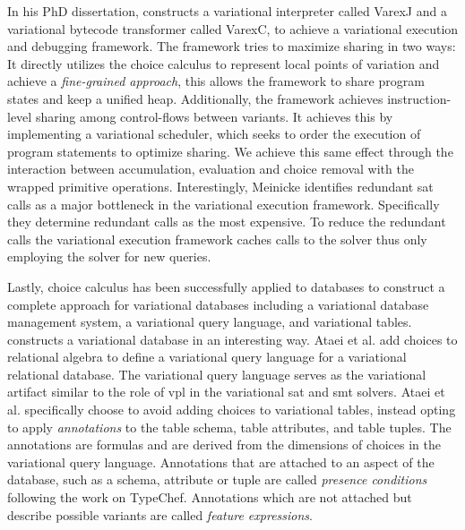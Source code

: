 In his PhD dissertation, \citet{M14,JensDebugging} constructs a variational
interpreter called VarexJ and a variational bytecode transformer called VarexC,
to achieve a variational execution and debugging framework. The framework tries
to maximize sharing in two ways: It directly utilizes the choice calculus to
represent local points of variation and achieve a \emph{fine-grained approach},
this allows the framework to share program states and keep a unified heap.
Additionally, the framework achieves instruction-level sharing among
control-flows between variants. It achieves this by implementing a variational
scheduler, which seeks to order the execution of program statements to optimize
sharing. We achieve this same effect through the interaction between
accumulation, evaluation and choice removal with the wrapped primitive
operations. Interestingly, Meinicke identifies redundant \ac{sat} calls as a
major bottleneck in the variational execution framework. Specifically they
determine redundant  calls as the most expensive. To reduce the
redundant calls the variational execution framework caches calls to the solver
thus only employing the solver for new queries.


Lastly, choice calculus has been successfully applied to databases to construct
a complete approach for variational databases including a variational database
management system, a variational query language, and variational tables.
\citet{ATW17dbpl,ATW18poly} constructs a variational database in an interesting
way. Ataei et al. add choices to relational algebra to define a variational
query language for a variational relational database. The variational query
language serves as the variational artifact similar to the role of \ac{vpl} in
the variational \ac{sat} and \ac{smt} solvers. Ataei et al. specifically choose
to avoid adding choices to variational tables, instead opting to apply
\emph{annotations} to the table schema, table attributes, and table tuples. The
annotations are \pl{} formulas and are derived from the dimensions of choices in
the variational query language. Annotations that are attached to an aspect of
the database, such as a schema, attribute or tuple are called \emph{presence
  conditions} following the work on TypeChef. Annotations which are not attached
but describe possible variants are called \emph{feature expressions}.

